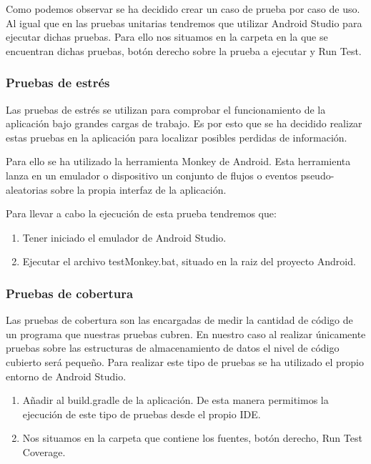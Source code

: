 
Como podemos observar se ha decidido crear un caso de prueba por caso de uso. Al igual que en las pruebas unitarias tendremos que utilizar Android Studio para ejecutar dichas pruebas. Para ello nos situamos en la carpeta en la que se encuentran dichas pruebas, botón derecho sobre la prueba a ejecutar y Run Test.

\subsubsection{Pruebas de estrés}

Las pruebas de estrés se utilizan para comprobar el funcionamiento de la aplicación bajo grandes cargas de trabajo. Es por esto que se ha decidido realizar estas pruebas en la aplicación para localizar posibles perdidas de información.

Para ello se ha utilizado la herramienta Monkey de Android. Esta herramienta lanza en un emulador o dispositivo un conjunto de flujos o eventos pseudo-aleatorias sobre la propia interfaz de la aplicación.

Para llevar a cabo la ejecución de esta prueba tendremos que:

\begin{enumerate}
		\item Tener iniciado el emulador de Android Studio.
	
	\item Ejecutar el archivo testMonkey.bat, situado en la raiz del proyecto Android.

\end{enumerate}

\subsubsection{Pruebas de cobertura}

Las pruebas de cobertura son las encargadas de medir la cantidad de código de un programa que nuestras pruebas cubren. En nuestro caso al realizar únicamente pruebas sobre las estructuras de almacenamiento de datos el nivel de código cubierto será pequeño.
Para realizar este tipo de pruebas se ha utilizado el propio entorno de Android Studio.

\begin{enumerate}

	\item Añadir al build.gradle de la aplicación. 
	De esta manera permitimos la ejecución de este tipo de pruebas desde el propio IDE.
	\item Nos situamos en la carpeta que contiene los fuentes, botón derecho, Run Test Coverage.


\end{enumerate}


